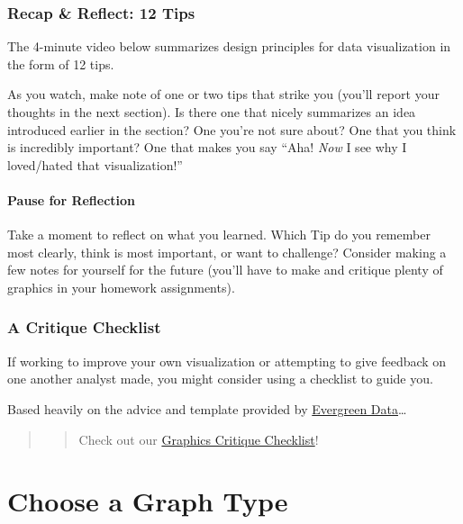 \documentclass[
  letterpaper,
  DIV=11,
  numbers=noendperiod]{scrreprt}
\theoremstyle{remark}
\begin{document}
\section{Recap \& Reflect: 12 Tips}\label{recap-reflect-12-tips}

The 4-minute video below summarizes design principles for data
visualization in the form of 12 tips.

As you watch, make note of one or two tips that strike you (you'll
report your thoughts in the next section). Is there one that nicely
summarizes an idea introduced earlier in the section? One you're not
sure about? One that you think is incredibly important? One that makes
you say ``Aha! \emph{Now} I see why I loved/hated that visualization!''

\subsection{Pause for Reflection}\label{pause-for-reflection}

Take a moment to reflect on what you learned. Which Tip do you remember
most clearly, think is most important, or want to challenge? Consider
making a few notes for yourself for the future (you'll have to make and
critique plenty of graphics in your homework assignments).

\section{A Critique Checklist}\label{a-critique-checklist}

If working to improve your own visualization or attempting to give
feedback on one another analyst made, you might consider using a
checklist to guide you.

Based heavily on the advice and template provided by
\href{https://stephanieevergreen.com/data-visualization-checklist/}{Evergreen
Data}\ldots{}

\begin{quote}
\begin{quote}
Check out our
\href{https://stacyderuiter.github.io/stat245-sp25/GraphicsCritiqueChecklist.pdf}{Graphics
Critique Checklist}!
\end{quote}
\end{quote}

\part{Choose a Graph Type}
\end{document}
